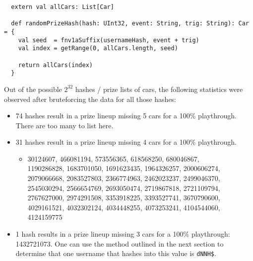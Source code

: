 \documentclass[14pt,a4paper,notitlepage]{extarticle}
\begin{document}
            \begin{lstlisting}
  extern val allCars: List[Car]

  def randomPrizeHash(hash: UInt32, event: String, trig: String): Car = {
    val seed  = fnv1aSuffix(usernameHash, event + trig)
    val index = getRange(0, allCars.length, seed)

    return allCars(index)
  }
            \end{lstlisting}

                Out of the possible $2^{32}$ hashes / prize lists of cars, the following statistics
                were observed after bruteforcing the data for all those hashes:

                \begin{itemize}
                    \item 74 hashes result in a prize lineup missing 5 cars for a 100\% playthrough.
                          There are too many to list here.
                    \item 31 hashes result in a prize lineup missing 4 cars for a 100\% playthrough.
                    \begin{itemize}
                        \item 30124607,
                        466081194,
                        573556365,
                        618568250,
                        680046867,
                        \\1190286828,
                        1683701050,
                        1691623435,
                        1964326257,
                        2000606274,
                        \\2079066668,
                        2083527803,
                        2366774963,
                        2462023237,
                        2499046370,
                        \\2545030294,
                        2566654769,
                        2693050474,
                        2719867818,
                        2721109794,
                        \\2767627000,
                        2974291508,
                        3353918225,
                        3393527741,
                        3670790600,
                        \\4029161521,
                        4032302124,
                        4034448255,
                        4073253241,
                        4104544060,
                        \\4124159775
                    \end{itemize}
                    \item 1 hash results in a prize lineup missing 3 cars for a 100\% playthrough: 1432721073.
                    One can use the method outlined in the next section to determine that one
                    username that hashes into this value is \texttt{dNNH\$}.
                \end{itemize}
\end{document}
